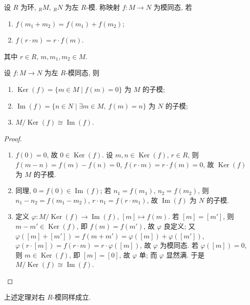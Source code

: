 \begin{definition}[模同态]\label{def:module-hom}
设 $R$ 为环, ${}_R M$, ${}_R N$ 为左 $R$-模. 称映射 $f\colon M\to N$ 为模同态, 若
\begin{enumerate}
  \item $f(m_1+m_2)=f(m_1)+f(m_2)$;
  \item $f(r\cdot m)=r\cdot f(m)$.
\end{enumerate}
其中 $r\in R$, $m,m_1,m_2\in M$.
\end{definition}

\begin{theorem}[同态基本定理]\label{thm:module-iso}
设 $f\colon M\to N$ 为左 $R$-模同态, 则
\begin{enumerate}
  \item $\operatorname{Ker}(f)=\{m\in M\mid f(m)=0\}$ 为 $M$ 的子模;
  \item $\operatorname{Im}(f)=\{n\in N\mid \exists m\in M,\ f(m)=n\}$ 为 $N$ 的子模;
  \item $M/\operatorname{Ker}(f)\cong\operatorname{Im}(f)$.
\end{enumerate}
\end{theorem}

\begin{proof}
\mbox{}\par\vspace{-0.2em}
\begin{enumerate}
  \item $f(0)=0$, 故 $0\in\operatorname{Ker}(f)$. 设 $m,n\in\operatorname{Ker}(f)$, $r\in R$, 则
  $f(m-n)=f(m)-f(n)=0$, $f(r\cdot m)=r\cdot f(m)=0$, 故 $\operatorname{Ker}(f)$ 为 $M$ 的子模.
  \item 同理, $0=f(0)\in\operatorname{Im}(f)$; 若 $n_1=f(m_1)$, $n_2=f(m_2)$, 则
  $n_1-n_2=f(m_1-m_2)$, $r\cdot n_1=f(r\cdot m_1)$, 故 $\operatorname{Im}(f)$ 为 $N$ 的子模.
  \item 定义 $\varphi\colon M/\operatorname{Ker}(f)\to\operatorname{Im}(f)$, $[m]\mapsto f(m)$.
  若 $[m]=[m']$, 则 $m-m'\in\operatorname{Ker}(f)$, 即 $f(m)=f(m')$, 故 $\varphi$ 良定义;
  又 $\varphi([m]+[m'])=f(m+m')=\varphi([m])+\varphi([m'])$, $\varphi(r\cdot[m])=f(r\cdot m)=r\cdot\varphi([m])$,
  故 $\varphi$ 为模同态. 若 $\varphi([m])=0$, 则 $m\in\operatorname{Ker}(f)$, 即 $[m]=[0]$, 故 $\varphi$ 单;
  而 $\varphi$ 显然满. 于是 $M/\operatorname{Ker}(f)\cong\operatorname{Im}(f)$.
\end{enumerate}
\end{proof}

\begin{remark}\label{rem:module-iso-right}
上述定理对右 $R$-模同样成立.
\end{remark}

